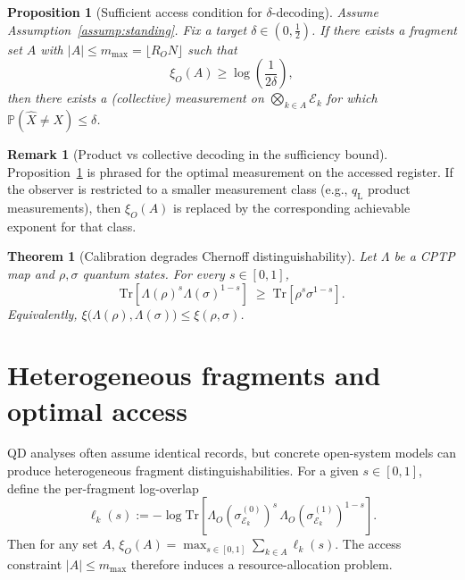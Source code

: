 \documentclass[aps,pra,twocolumn,superscriptaddress,nofootinbib]{revtex4-2}
\newcommand{\cE}{\mathcal{E}}
\newcommand{\1}{\mathbf{1}}
\newcommand{\QCBdist}{\xi}
\newcommand{\Prob}{\mathbb{P}}
\theoremstyle{definition}
\newtheorem{remark}{Remark}
\theoremstyle{plain}
\newtheorem{theorem}{Theorem}
\newtheorem{proposition}{Proposition}
\begin{document}
\begin{proposition}[Sufficient access condition for $\delta$-decoding]
\label{prop:access-threshold}
Assume Assumption~\ref{assump:standing}.
Fix a target $\delta\in(0,\tfrac12)$.
If there exists a fragment set $A$ with $|A|\le m_{\max}=\lfloor R_O N\rfloor$ such that
\begin{equation}
\QCBdist_O(A)\ge \log\!\left(\frac{1}{2\delta}\right),
\label{eq:access-suff}
\end{equation}
then there exists a (collective) measurement on $\bigotimes_{k\in A}\cE_k$ for which $\Prob(\widehat{X}\neq X)\le\delta$.
\end{proposition}

\begin{remark}[Product vs collective decoding in the sufficiency bound]
Proposition~\ref{prop:access-threshold} is phrased for the optimal measurement on the accessed register.
If the observer is restricted to a smaller measurement class (e.g., $q_{\mathrm{L}}$ product measurements), then $\QCBdist_O(A)$ is replaced by the corresponding achievable exponent for that class.
\end{remark}

\begin{theorem}[Calibration degrades Chernoff distinguishability]
\label{thm:chernoff-dpi}
Let $\Lambda$ be a CPTP map and $\rho,\sigma$ quantum states.
For every $s\in[0,1]$,
\begin{equation}
\mathrm{Tr}\!\left[\Lambda(\rho)^s\Lambda(\sigma)^{1-s}\right]
\;\ge\;
\mathrm{Tr}\!\left[\rho^s\sigma^{1-s}\right].
\label{eq:chernoff-dpi}
\end{equation}
Equivalently, $\QCBdist\bigl(\Lambda(\rho),\Lambda(\sigma)\bigr)\le \QCBdist(\rho,\sigma)$.
\end{theorem}

\section{Heterogeneous fragments and optimal access}

QD analyses often assume identical records, but concrete open-system models can produce heterogeneous fragment distinguishabilities.
For a given $s\in[0,1]$, define the per-fragment log-overlap
\begin{equation}
\ell_k(s):=-\log \mathrm{Tr}\!\left[\Lambda_O(\sigma^{(0)}_{\cE_k})^s\,\Lambda_O(\sigma^{(1)}_{\cE_k})^{1-s}\right].
\end{equation}
Then for any set $A$,
$\QCBdist_O(A)=\max_{s\in[0,1]}\sum_{k\in A}\ell_k(s)$.
The access constraint $|A|\le m_{\max}$ therefore induces a resource-allocation problem.
\end{document}
